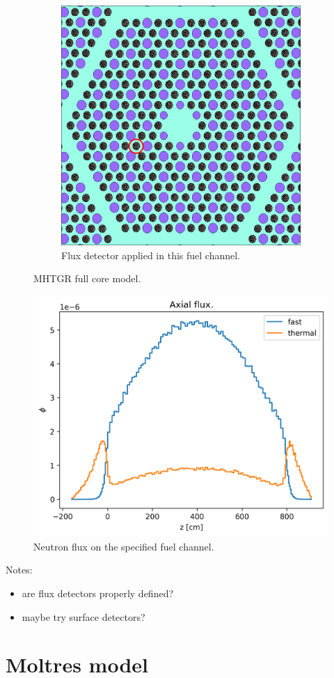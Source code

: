 \documentclass[11pt,letterpaper]{article}
\begin{document}
\begin{figure}[]
\begin{subfigure}[t]{0.4\textwidth}
			\includegraphics[width=\linewidth]{figures/axial-detector2.png}
			\caption{Flux detector applied in this fuel channel.}
		\end{subfigure}
		\hfill
		\caption{MHTGR full core model.}
		\label{fig:detector}
	\end{figure}

	\begin{figure}[]
		\centering
		\includegraphics[width=\linewidth]{figures/axial1.png}
		\hfill
		\caption{Neutron flux on the specified fuel channel.}
		\label{fig:axial}
	\end{figure}

Notes:
	\begin{itemize}
		\item are flux detectors properly defined?
		\item maybe try surface detectors?
	\end{itemize}

\section{Moltres model}



\pagebreak


\end{document}
